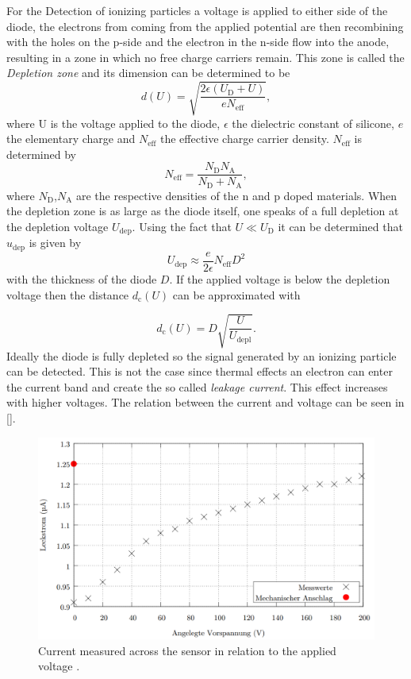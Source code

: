 For the Detection of ionizing particles a voltage is applied to either side of the diode, the electrons from coming from the applied potential are then recombining with the holes on the p-side and the electron in the n-side flow into the anode, resulting in a zone in which no free charge carriers remain. This zone is called the \textit{Depletion zone} and its dimension can be determined to be
\begin{equation}
	d(U) = \sqrt{\frac{2\epsilon(U_\mathrm{D}+ U)}{eN_\mathrm{eff}}},
	\label{depl}
\end{equation}
where U is the voltage applied to the diode, $\epsilon$ the dielectric constant of silicone, $e$ the elementary charge and $N_\mathrm{eff}$ the effective charge carrier density. $N_\mathrm{eff}$ is determined by 
\begin{equation}
	N_\mathrm{eff} = \frac{N_\mathrm{D}N_\mathrm{A}}{N_\mathrm{D}+N_\mathrm{A}},
\end{equation}
where $N_\mathrm{D}$,$N_\mathrm{A}$ are the respective densities of the n and p doped materials. When the depletion zone is as large as the diode itself, one speaks of a full depletion at the depletion voltage $U_\mathrm{dep}$. Using the fact that $U\ll U_\mathrm{D}$ it can be determined that $u_\mathrm{dep}$ is given by
\begin{equation}
	U_\mathrm{dep} \approx \frac{e}{2\epsilon} N_\mathrm{eff} D^2
\end{equation}
with the thickness of the diode $D$. If the applied voltage is below the depletion voltage then the distance $d_\mathrm{c}(U)$ can be approximated with

\begin{equation}
	d_\mathrm{c}(U)= D\sqrt{\frac{U}{U_\mathrm{depl}}}.
\end{equation}
Ideally the diode is fully depleted so the signal generated by an ionizing particle can be detected. This is not the case since thermal effects an electron can enter the current band and create the so called \textit{leakage current}. This effect increases with higher voltages. The relation between the current and voltage can be seen in \autoref{}.

\begin{figure}
	\centering
	\includegraphics[width=0.7\linewidth]{../Assets/leackage}
	\caption{Current measured across the sensor in relation to the applied voltage \cite{lab}.}
	\label{fig:leackage}
\end{figure}



